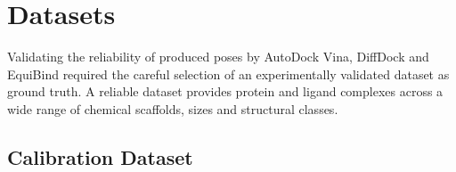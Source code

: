 \hypertarget{datasets}{%
\section{Datasets}\label{datasets}}

Validating the reliability of produced poses by AutoDock Vina, DiffDock and EquiBind required the careful selection of an experimentally validated dataset as ground truth. A reliable dataset provides protein and ligand complexes across a wide range of chemical scaffolds, sizes and structural classes.

\protect\hypertarget{_Toc235735885}{}{}

\hypertarget{calibration-dataset}{%
\subsection{Calibration Dataset}\label{calibration-dataset}}


